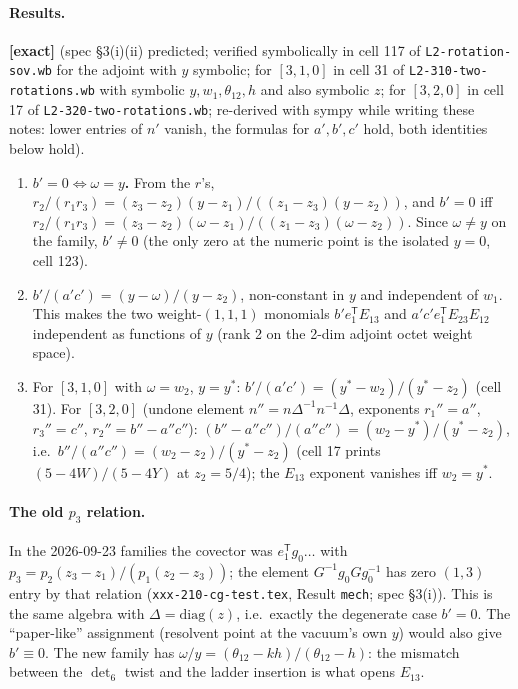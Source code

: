 \documentclass[11pt]{article}
\newcommand{\eT}{e_1^{\mathsf T}}
\newcommand{\thh}{\theta_{12}}
\newcommand{\ex}{\textbf{[exact]}}
\newcommand{\nb}[1]{\texttt{#1}}
\begin{document}
\paragraph{Results.} \ex{} (spec \S3(i)(ii) predicted; verified symbolically in cell 117 of \nb{L2-rotation-sov.wb} for the adjoint with $y$ symbolic; for $[3,1,0]$ in cell 31 of \nb{L2-310-two-rotations.wb} with symbolic $y,w_1,\thh,h$ and also symbolic $z$; for $[3,2,0]$ in cell 17 of \nb{L2-320-two-rotations.wb}; re-derived with sympy while writing these notes: lower entries of $n'$ vanish, the formulas for $a',b',c'$ hold, both identities below hold).
\begin{enumerate}
\item \textbf{$b'=0\iff\omega=y$.} From the $r$'s, $r_2/(r_1r_3)=(z_3-z_2)(y-z_1)/((z_1-z_3)(y-z_2))$, and $b'=0$ iff $r_2/(r_1r_3)=(z_3-z_2)(\omega-z_1)/((z_1-z_3)(\omega-z_2))$. Since $\omega\ne y$ on the family, $b'\ne0$ (the only zero at the numeric point is the isolated $y=0$, cell 123).
\item \textbf{$b'/(a'c')=(y-\omega)/(y-z_2)$}, non-constant in $y$ and independent of $w_1$. This makes the two weight-$(1,1,1)$ monomials $b'\eT E_{13}$ and $a'c'\eT E_{23}E_{12}$ independent as functions of $y$ (rank 2 on the 2-dim adjoint octet weight space).
\item For $[3,1,0]$ with $\omega=w_2$, $y=y^*$: $b'/(a'c')=(y^*-w_2)/(y^*-z_2)$ (cell 31). For $[3,2,0]$ (undone element $n''=n\Delta^{-1}n^{-1}\Delta$, exponents $r_1''=a''$, $r_3''=c''$, $r_2''=b''-a''c''$): $(b''-a''c'')/(a''c'')=(w_2-y^*)/(y^*-z_2)$, i.e.\ $b''/(a''c'')=(w_2-z_2)/(y^*-z_2)$ (cell 17 prints $(5-4W)/(5-4Y)$ at $z_2=5/4$); the $E_{13}$ exponent vanishes iff $w_2=y^*$.
\end{enumerate}

\paragraph{The old $p_3$ relation.} In the 2026-09-23 families the covector was $\eT g_0\ldots$ with $p_3=p_2(z_3-z_1)/(p_1(z_2-z_3))$; the element $G^{-1}g_0Gg_0^{-1}$ has zero $(1,3)$ entry by that relation (\nb{xxx-210-cg-test.tex}, Result \texttt{mech}; spec \S3(i)). This is the same algebra with $\Delta=\mathrm{diag}(z)$, i.e.\ exactly the degenerate case $b'=0$. The ``paper-like'' assignment (resolvent point at the vacuum's own $y$) would also give $b'\equiv0$. The new family has $\omega/y=(\thh-kh)/(\thh-h)$: the mismatch between the $\det_6$ twist and the ladder insertion is what opens $E_{13}$.
\end{document}
